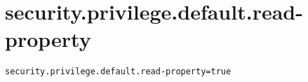 \section{security.privilege.default.read-property}
\label{configuration:SecurityPrivilegeDefaultReadProperty}
\ClearAPI
\TODO
{}
\begin{lstlisting}[style=Props,caption={Usage example for \textit{security.privilege.default.read-property}}]
security.privilege.default.read-property=true
\end{lstlisting}